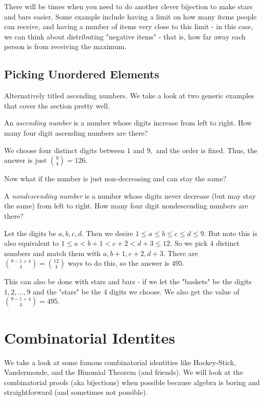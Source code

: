 There will be times when you need to do another clever bijection to make stars and bars easier. Some example include having a limit on how many items people can receive, and having a number of items very close to this limit - in this case, we can think about distributing "negative items" - that is, how far away each person is from receiving the maximum.

\subsection{Picking Unordered Elements}
Alternatively titled ascending numbers. We take a look at two generic examples that cover the section pretty well.

\begin{exam}
An \textit{ascending number} is a number whose digits increase from left to right. How many four digit ascending numbers are there?
\end{exam}

\begin{sol}
We choose four distinct digits between $1$ and $9,$ and the order is fixed. Thus, the answer is just $\binom{9}{4}=126.$
\end{sol}

Now what if the number is just non-decreasing and can stay the same?

\begin{exam}
A \textit{nondescending number} is a number whose digits never decrease (but may stay the same) from left to right. How many four digit nondescending numbers are there?
\end{exam}

\begin{sol}
Let the digits be $a,b,c,d.$ Then we desire $1\leq a\leq b\leq c\leq d\leq 9.$ But note this is also equivalent to $1\leq a<b+1<c+2<d+3\leq 12.$ So we pick $4$ distinct numbers and match them with $a,b+1,c+2,d+3.$ There are $\binom{9-1+4}{4}=\binom{12}{4}$ ways to do this, so the answer is $495.$
\end{sol}

This can also be done with stars and bars - if we let the "baskets" be the digits $1,2,\ldots, 9$ and the "stars" be the 4 digits we choose. We also get the value of $\binom{9-1+4}{4}=495.$

\section{Combinatorial Identites}
We take a look at some famous combinatorial identities like Hockey-Stick, Vandermonde, and the Binomial Theorem (and friends). We will look at the combinatorial proofs (aka bijections) when possible because algebra is boring and straightforward (and sometimes not possible).

